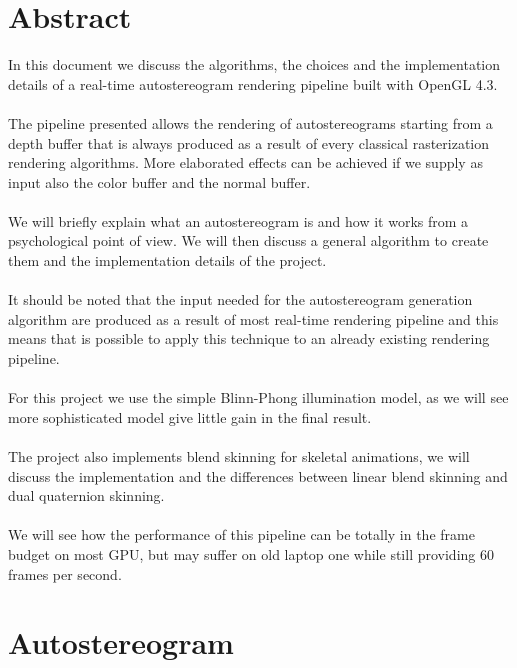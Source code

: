 \documentclass[12pt, a4paper]{article}
\begin{document}
\section{Abstract}
In this document we discuss the algorithms, the choices and the implementation details of a real-time autostereogram rendering pipeline built with OpenGL 4.3.\\\\
The pipeline presented allows the rendering of autostereograms starting from a depth buffer that is always produced
as a result of every classical rasterization rendering algorithms. More elaborated effects can be achieved if we supply as input also the color buffer and 
the normal buffer.\\\\
We will briefly explain what an autostereogram is and how it works from a psychological point of view. 
We will then discuss a general algorithm to create them and the implementation details of the project.\\\\
It should be noted that the input needed for the autostereogram generation algorithm are produced as a result of most real-time rendering pipeline and this 
means that is possible to apply this technique to an already existing rendering pipeline.\\\\
For this project we use the simple Blinn-Phong illumination model, as we will see more sophisticated model give little gain in 
the final result.\\\\
The project also implements blend skinning for skeletal animations, we will discuss the implementation and the differences between linear blend skinning and
dual quaternion skinning.\\\\
We will see how the performance of this pipeline can be totally in the frame budget on most GPU, but may suffer on old laptop one while still
providing 60 frames per second.

\clearpage
\section{Autostereogram}
\end{document}
